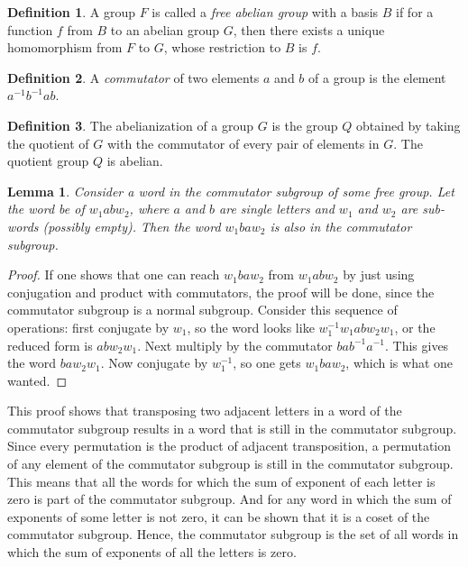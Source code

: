 \documentclass[12pt, titlepage]{article}
\newtheorem{lem}[thm]{Lemma}
\theoremstyle{definition}
\newtheorem{defn}{Definition}[section]
\begin{document}
\begin{defn}
A group $F$ is called a \emph{free abelian group} with a basis $B$ if for a function $f$ from $B$ to an abelian group $G$, then there exists a unique homomorphism from $F$ to $G$, whose restriction to $B$ is $f$.
\end{defn}

\begin{defn}
A \emph{commutator} of two elements $a$ and $b$ of a group is the element $a^{-1}b^{-1}ab$.
\end{defn}

\begin{defn}
The abelianization of a group $G$ is the group $Q$ obtained by taking the quotient of $G$ with the commutator of every pair of elements in $G$. The quotient group $Q$ is abelian.
\end{defn}

\begin{lem}\label{commu}
Consider a word in the commutator subgroup of some free group. Let the word be of $w_1abw_2$, where $a$ and $b$ are single letters and $w_1$ and $w_2$ are sub-words (possibly empty). Then the word $w_1baw_2$ is also in the commutator subgroup.
\end{lem}

\begin{proof}
If one shows that one can reach $w_1baw_2$ from $w_1abw_2$ by just using conjugation and product with commutators, the proof will be done, since the commutator subgroup is a normal subgroup. Consider this sequence of operations: first conjugate by $w_1$, so the word looks like $w_1^{-1}w_1abw_2w_1$, or the reduced form is $abw_2w_1$. Next multiply by the commutator $bab^{-1}a^{-1}$. This gives the word $baw_2w_1$. Now conjugate by $w_1^{-1}$, so one gets $w_1baw_2$, which is what one wanted.
\end{proof}

This proof shows that transposing two adjacent letters in a word of the commutator subgroup results in a word that is still in the commutator subgroup. Since every permutation is the product of adjacent transposition, a permutation of any element of the commutator subgroup is still in the commutator subgroup. This means that all the words for which the sum of exponent of each letter is zero is part of the commutator subgroup. And for any word in which the sum of exponents of some letter is not zero, it can be shown that it is a coset of the commutator subgroup. Hence, the commutator subgroup is the set of all words in which the sum of exponents of all the letters is zero.
\end{document}
